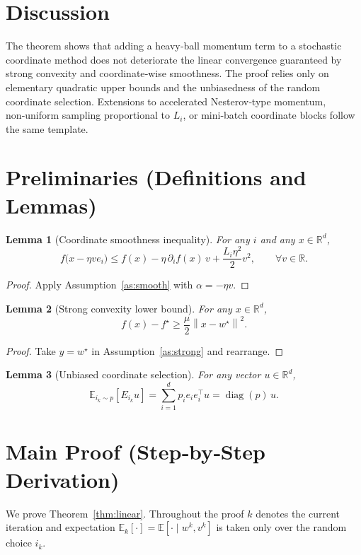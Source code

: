 \documentclass[11pt]{article}
\newtheorem{lemma}{Lemma}
\newcommand{\E}{\mathbb{E}}
\newcommand{\R}{\mathbb{R}}
\newcommand{\norm}[1]{\left\|#1\right\|}
\begin{document}
\section*{Discussion}
The theorem shows that adding a heavy‑ball momentum term to a stochastic coordinate method does not deteriorate the linear convergence guaranteed by strong convexity and coordinate‑wise smoothness.  The proof relies only on elementary quadratic upper bounds and the unbiasedness of the random coordinate selection.  Extensions to accelerated Nesterov‑type momentum, non‑uniform sampling proportional to $L_i$, or mini‑batch coordinate blocks follow the same template.

\section*{Preliminaries (Definitions and Lemmas)}
\begin{lemma}[Coordinate smoothness inequality]\label{lem:smooth}
For any $i$ and any $x\in\R^{d}$,
\[
f\!\bigl(x-\eta v e_i\bigr)\le f(x)-\eta\,\partial_i f(x)\,v+\frac{L_i\eta^{2}}{2}v^{2},
\qquad\forall v\in\R .
\]
\end{lemma}
\begin{proof}
Apply Assumption~\ref{as:smooth} with $\alpha=-\eta v$.
\end{proof}
\begin{lemma}[Strong convexity lower bound]\label{lem:strong}
For any $x\in\R^{d}$,
\[
f(x)-f^{\star}\ge \frac{\mu}{2}\norm{x-w^{\star}}^{2}.
\]
\end{lemma}
\begin{proof}
Take $y=w^{\star}$ in Assumption~\ref{as:strong} and rearrange.
\end{proof}
\begin{lemma}[Unbiased coordinate selection]\label{lem:unbiased}
For any vector $u\in\R^{d}$,
\[
\E_{i_k\sim p}[E_{i_k}u]=\sum_{i=1}^{d}p_i e_i e_i^{\top}u
= \operatorname{diag}(p)\,u .
\]
\end{lemma}

\section*{Main Proof (Step‑by‑Step Derivation)}
We prove Theorem~\ref{thm:linear}.  Throughout the proof $k$ denotes the current iteration and expectation $\E_k[\cdot]=\E[\cdot\mid w^{k},v^{k}]$ is taken only over the random choice $i_k$.
\end{document}
